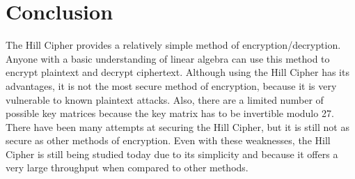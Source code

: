 \documentclass{article}
\begin{document}
\section{Conclusion}
The Hill Cipher provides a relatively simple method of encryption/decryption. Anyone with a basic understanding of linear algebra can use this method to encrypt plaintext and decrypt ciphertext. Although using the Hill Cipher has its advantages, it is not the most secure method of encryption, because it is very vulnerable to known plaintext attacks.\cite{sec} Also, there are a limited number of possible key matrices because the key matrix has to be invertible modulo 27. There have been many attempts at securing the Hill Cipher, but it is still not as secure as other methods of encryption. Even with these weaknesses, the Hill Cipher is still being studied today due to its simplicity and because it offers a very large throughput when compared to other methods.

\printbibliography
\end{document}
